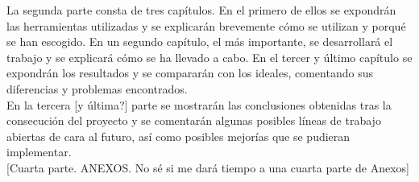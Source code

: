 La segunda parte consta de tres capítulos. En el primero de ellos se expondrán las herramientas utilizadas y se explicarán brevemente cómo se utilizan y porqué se han escogido. En un segundo capítulo, el más importante, se desarrollará el trabajo y se explicará cómo se ha llevado a cabo. En el tercer y último capítulo se expondrán los resultados y se compararán con los ideales, comentando sus diferencias y problemas encontrados.\\

En la tercera [y última?] parte se mostrarán las conclusiones obtenidas tras la consecución del proyecto y se comentarán algunas posibles líneas de trabajo abiertas de cara al futuro, así como posibles mejorías que se pudieran implementar. \\

[Cuarta parte. ANEXOS. No sé si me dará tiempo a una cuarta parte de Anexos]




























